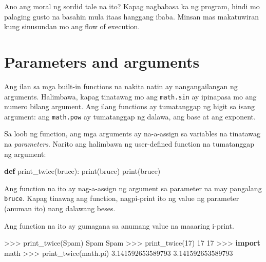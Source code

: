\documentclass[10pt,]{book}
\newenvironment{Shaded}{}{}
\newcommand{\BuiltInTok}[1]{\textcolor[rgb]{0.00,0.50,0.00}{#1}}
\newcommand{\DecValTok}[1]{\textcolor[rgb]{0.25,0.63,0.44}{#1}}
\newcommand{\FloatTok}[1]{\textcolor[rgb]{0.25,0.63,0.44}{#1}}
\newcommand{\ImportTok}[1]{\textcolor[rgb]{0.00,0.50,0.00}{\textbf{#1}}}
\newcommand{\KeywordTok}[1]{\textcolor[rgb]{0.00,0.44,0.13}{\textbf{#1}}}
\newcommand{\NormalTok}[1]{#1}
\newcommand{\OperatorTok}[1]{\textcolor[rgb]{0.40,0.40,0.40}{#1}}
\newcommand{\StringTok}[1]{\textcolor[rgb]{0.25,0.44,0.63}{#1}}
\begin{document}
Ano ang moral ng sordid tale na ito? Kapag nagbabasa ka ng program,
hindi mo palaging gusto na basahin mula itaas hanggang ibaba. Minsan mas
makatuwiran kung sinusundan mo ang flow of execution.

\section{Parameters and arguments}\label{parameters-and-arguments}

  

Ang ilan sa mga built-in functions na nakita natin ay nangangailangan ng
arguments. Halimbawa, kapag tinatawag mo ang \texttt{math.sin} ay
ipinapasa mo ang numero bilang argument. Ang ilang functions ay
tumatanggap ng higit sa isang argument: ang \texttt{math.pow} ay
tumatanggap ng dalawa, ang base at ang exponent.

Sa loob ng function, ang mga arguments ay na-a-assign sa variables na
tinatawag na \emph{parameters}. Narito ang halimbawa ng user-defined
function na tumatanggap ng argument:


\begin{Shaded}
\begin{Highlighting}[]
\KeywordTok{def}\NormalTok{ print\_twice(bruce):}
    \BuiltInTok{print}\NormalTok{(bruce)}
    \BuiltInTok{print}\NormalTok{(bruce)}
\end{Highlighting}
\end{Shaded}

Ang function na ito ay nag-a-assign ng argument sa parameter na may
pangalang \texttt{bruce}. Kapag tinawag ang function, nagpi-print ito ng
value ng parameter (anuman ito) nang dalawang beses.

Ang function na ito ay gumagana sa anumang value na maaaring i-print.

\begin{Shaded}
\begin{Highlighting}[]
\OperatorTok{\textgreater{}\textgreater{}\textgreater{}}\NormalTok{ print\_twice(}\StringTok{\textquotesingle{}Spam\textquotesingle{}}\NormalTok{)}
\NormalTok{Spam}
\NormalTok{Spam}
\OperatorTok{\textgreater{}\textgreater{}\textgreater{}}\NormalTok{ print\_twice(}\DecValTok{17}\NormalTok{)}
\DecValTok{17}
\DecValTok{17}
\OperatorTok{\textgreater{}\textgreater{}\textgreater{}} \ImportTok{import}\NormalTok{ math}
\OperatorTok{\textgreater{}\textgreater{}\textgreater{}}\NormalTok{ print\_twice(math.pi)}
\FloatTok{3.141592653589793}
\FloatTok{3.141592653589793}
\end{Highlighting}
\end{Shaded}
\end{document}
